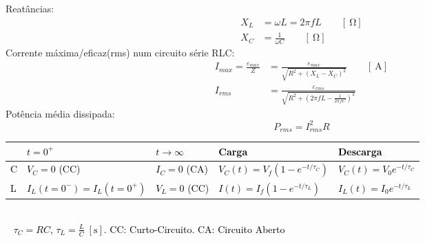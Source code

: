 \documentclass[a4paper,10pt]{extarticle} %
\newcommand{\mybox}[2]{
    \begin{tcolorbox}[colback=lightblue!5!white,colframe=lightblue!75!black,boxsep=1pt,arc=0pt,outer arc=0pt,title={\textcolor{black}{#1}}]
        \textcolor{black}{#2}
    \end{tcolorbox}
}
\begin{document}
\begin{multicols}{2}
{    Reatâncias:
    \begin{align}
        X_L &= \omega  L = 2 \pi f L \qquad [\SI{}{\ohm}]\\
        X_C &= \frac{1}{\omega C} \qquad [\SI{}{\ohm}]
    \end{align}
    Corrente máxima/eficaz(rms) num circuito série RLC:
    \begin{align}
        I_{max} = \frac{\varepsilon_{max}}{Z} &= \frac{\varepsilon_{max}}{\sqrt{R^2 + \left( X_L - X_C\right)^2}}\qquad [\SI{}{\ampere}]\\
        I_{rms}   &= \frac{\varepsilon_{rms}}{\sqrt{R^2 + \left( 2 \pi f L - \frac{1}{2 \pi f C} \right)^2}}
    \end{align}
    Potência média dissipada:
    \begin{equation}
        P_{rms} = I_{rms}^2 R
    \end{equation}
}
\end{multicols}

\mybox{Circuitos em Corrente Contínua (DC). Condições Limite}{
    \begin{tabular}{||l|l|l|l|l||}
        \hline   &{\bf $t=0^+$} &{\bf $t\to\infty$} &{\bf Carga} &{\bf Descarga}\\
        \hline C  & $V_C = 0$ (CC) & $I_C =0 $ (CA) &$V_C(t) = V_{f} (1-e^{-t/\tau_C}) $ &$V_C(t) = V_{0} e^{-t/\tau_C}$\\ 
        \hline L  & $I_L(t=0^-) = I_L(t=0^+)$ & $V_L =0 $ (CC)  &$I(t) = I_{f} (1-e^{-t/\tau_L})$ &$I_L(t) = I_{0} e^{-t/\tau_L}$\\ 
        \hline
    \end{tabular}
    \\~
    $\tau_C = RC$, $\tau_L = \frac{L}{C} \; [\mathrm{s}]$. CC: Curto-Circuito. CA: Circuito Aberto
}

\end{document}
